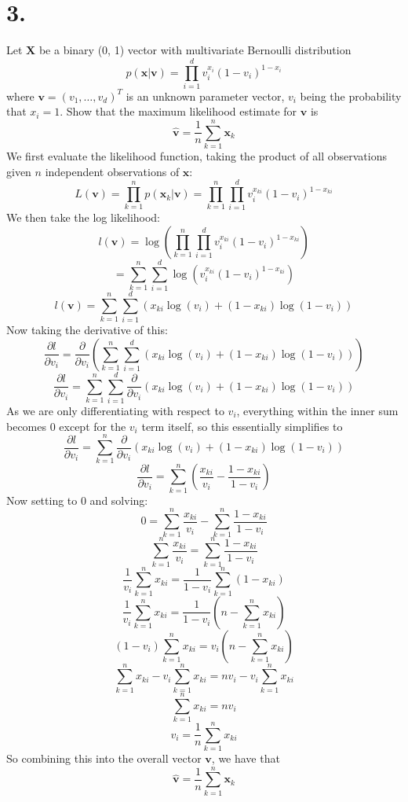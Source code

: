 \documentclass{article}
\begin{document}
{\Large 

\section*{3.}
Let \(\mathbf{X}\) be a binary (0, 1) vector with multivariate Bernoulli distribution
\[
  p(\mathbf{x}|\mathbf{v}) = \prod_{i=1}^d v_i^{x_i} (1 - v_i)^{1-x_i}
\]
where \(\mathbf{v} = (v_1, \dots, v_d)^T\) is an unknown parameter vector, \(v_i\) being the probability that \(x_i = 1\). Show that the maximum likelihood estimate for \(\mathbf{v}\) is
\[
  \hat{\mathbf{v}} = \frac{1}{n} \sum_{k=1}^{n} \mathbf{x}_k
\]
We first evaluate the likelihood function, taking the product of all observations given \(n\) independent observations of \(\mathbf{x}\):
\[
  L(\mathbf{v}) = \prod_{k=1}^{n} p(\mathbf{x}_k | \mathbf{v}) = \prod_{k=1}^{n} \prod_{i=1}^d v_i^{x_{ki}} (1 - v_i)^{1-x_{ki}}
\]
We then take the log likelihood:
\[
  l(\mathbf{v}) = \log(\prod_{k=1}^{n} \prod_{i=1}^d v_i^{x_{ki}} (1 - v_i)^{1-x_{ki}})
\]
\[
  = \sum_{k=1}^{n} \sum_{i=1}^{d} \log(v_i^{x_{ki}} (1 - v_i)^{1-x_{ki}})
\]
\[
  l(\mathbf{v})= \sum_{k=1}^{n} \sum_{i=1}^{d} (x_{ki}\log(v_i) + (1 - x_{ki})\log(1-v_i))
\]
Now taking the derivative of this:
\[
  \frac{\partial l}{\partial v_i} = \frac{\partial}{\partial v_i}(\sum_{k=1}^{n} \sum_{i=1}^{d} (x_{ki}\log(v_i) + (1 - x_{ki})\log(1-v_i)))
\]
\[
  \frac{\partial l}{\partial v_i} = \sum_{k=1}^{n} \sum_{i=1}^{d} \frac{\partial}{\partial v_i} (x_{ki}\log(v_i) + (1 - x_{ki})\log(1-v_i))
\]
As we are only differentiating with respect to \(v_i\), everything within the inner sum becomes 0 except for the \(v_i\) term itself, so this essentially simplifies to 
\[
  \frac{\partial l}{\partial v_i} = \sum_{k=1}^{n} \frac{\partial}{\partial v_i} (x_{ki}\log(v_i) + (1 - x_{ki})\log(1-v_i))
\]
\[
  \frac{\partial l}{\partial v_i} = \sum_{k=1}^{n} (\frac{x_{ki}}{v_i}  - \frac{1 - x_{ki}}{1 - v_i})
\]
Now setting to 0 and solving:
\[
  0 = \sum_{k=1}^{n} \frac{x_{ki}}{v_i} - \sum_{k=1}^{n}  \frac{1 - x_{ki}}{1 - v_i}
\]
\[
  \sum_{k=1}^{n} \frac{x_{ki}}{v_i} = \sum_{k=1}^{n}  \frac{1 - x_{ki}}{1 - v_i}
\]
\[
  \frac{1}{v_i} \sum_{k=1}^{n} x_{ki} = \frac{1}{1 - v_i} \sum_{k=1}^{n} (1 - x_{ki})
\]
\[
  \frac{1}{v_i} \sum_{k=1}^{n} x_{ki} = \frac{1}{1 - v_i}  (n - \sum_{k=1}^{n} x_{ki})
\]
\[
  (1 - v_i) \sum_{k=1}^{n} x_{ki} = v_i (n - \sum_{k=1}^{n} x_{ki})
\]
\[
  \sum_{k=1}^{n} x_{ki} - v_i \sum_{k=1}^{n} x_{ki} = nv_i - v_i\sum_{k=1}^{n} x_{ki}
\]
\[
  \sum_{k=1}^{n} x_{ki} = nv_i
\]
\[
  v_i = \frac{1}{n} \sum_{k=1}^{n} x_{ki}
\]
So combining this into the overall vector \(\mathbf{v}\), we have that 
\[
  \boxed{\hat{\mathbf{v}} = \frac{1}{n} \sum_{k=1}^{n} \mathbf{x}_k}
\]

}
\end{document}

